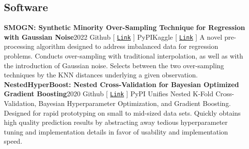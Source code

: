 \documentclass{article}
\begin{document}
\begin{bgbox}[
        height = \paperheight,
        width = 0.69\textwidth,
        colback = white
    ]
{            \section*{Software}
            \textbf{SMOGN: Synthetic Minority Over-Sampling Technique for Regression with Gaussian Noise}\hfill{2022}\newline
            \faGithub\space Github [ \href{https://github.com/nickkunz/smogn}{\texttt{Link}} ] \space\faPython\space PyPI\space\faUsers\space Kaggle [ \href{https://www.kaggle.com/aleksandradeis/regression-addressing-extreme-rare-cases}{\texttt{Link}} ]\newline\newline
            A novel pre-processing algorithm designed to address imbalanced data for regression problems. Conducts over-sampling with traditional interpolation, as well as with the introduction of Gaussian noise. Selects between the two over-sampling techniques by the KNN distances underlying a given observation.\newline\newline
            \textbf{NestedHyperBoost: Nested Cross-Validation for Bayesian Optimized Gradient Boosting}\hfill{2020}\newline
            \faGithub\space Github [ \href{https://github.com/nickkunz/nestedhyperboost}{\texttt{Link}} ] \space\faPython\space PyPI\newline\newline
            Unifies Nested K-Fold Cross-Validation, Bayesian Hyperparameter Optimization, and Gradient Boosting. Designed for rapid prototyping on small to mid-sized data sets. Quickly obtains high quality prediction results by abstracting away tedious hyperparameter tuning and implementation details in favor of usability and implementation speed.
}
\end{bgbox}
\end{document}
